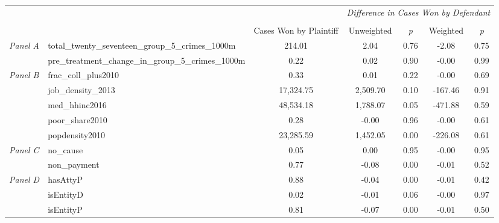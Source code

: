 \begin{tabular}{llccccc}
\toprule
 &  & \textit{} & \multicolumn{4}{c}{\textit{Difference in Cases Won by Defendant}} \\
\cline{4-7}
\\
 &  & Cases Won by Plaintiff & Unweighted & \emph{p} & Weighted & \emph{p} \\
\midrule
\multirow[c]{2}{3cm}{\textit{Panel A}} & total_twenty_seventeen_group_5_crimes_1000m & 214.01 & 2.04 & 0.76 & -2.08 & 0.75 \\
 & pre_treatment_change_in_group_5_crimes_1000m & 0.22 & 0.02 & 0.90 & -0.00 & 0.99 \\
\cline{1-7}
\multirow[c]{5}{3cm}{\textit{Panel B}} & frac_coll_plus2010 & 0.33 & 0.01 & 0.22 & -0.00 & 0.69 \\
 & job_density_2013 & 17,324.75 & 2,509.70 & 0.10 & -167.46 & 0.91 \\
 & med_hhinc2016 & 48,534.18 & 1,788.07 & 0.05 & -471.88 & 0.59 \\
 & poor_share2010 & 0.28 & -0.00 & 0.96 & -0.00 & 0.61 \\
 & popdensity2010 & 23,285.59 & 1,452.05 & 0.00 & -226.08 & 0.61 \\
\cline{1-7}
\multirow[c]{2}{3cm}{\textit{Panel C}} & no_cause & 0.05 & 0.00 & 0.95 & -0.00 & 0.95 \\
 & non_payment & 0.77 & -0.08 & 0.00 & -0.01 & 0.52 \\
\cline{1-7}
\multirow[c]{3}{3cm}{\textit{Panel D}} & hasAttyP & 0.88 & -0.04 & 0.00 & -0.01 & 0.42 \\
 & isEntityD & 0.02 & -0.01 & 0.06 & -0.00 & 0.97 \\
 & isEntityP & 0.81 & -0.07 & 0.00 & -0.01 & 0.50 \\
\cline{1-7}
\bottomrule
\end{tabular}
